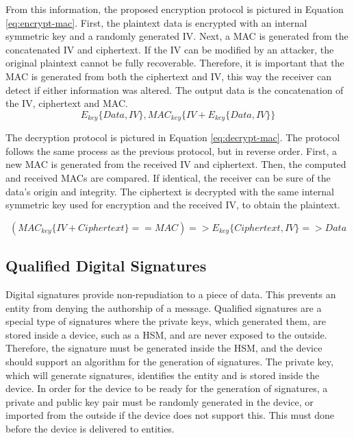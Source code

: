 From this information, the proposed encryption protocol is pictured in Equation \ref{eq:encrypt-mac}. First, the plaintext data is encrypted with an internal symmetric key and a randomly generated IV. Next, a MAC is generated from the concatenated IV and ciphertext.
If the IV can be modified by an attacker, the original plaintext cannot be fully recoverable. Therefore, it is important that the MAC is generated from both the ciphertext and IV, this way the receiver can detect if either information was altered.
The output data is the concatenation of the IV, ciphertext and MAC.
\begin{equation}
	\label{eq:encrypt-mac}
	E_{key}\{Data, IV\}, MAC_{key}\{IV+E_{key}\{Data, IV\}\}
\end{equation}

The decryption protocol is pictured in Equation \ref{eq:decrypt-mac}. The protocol follows the same process as the previous protocol, but in reverse order. First, a new MAC is generated from the received IV and ciphertext. Then, the computed and received MACs are compared. If identical, the receiver can be sure of the data's origin and integrity. The ciphertext is decrypted with the same internal symmetric key used for encryption and the received IV, to obtain the plaintext.

\begin{equation}
	\label{eq:decrypt-mac}
	(MAC_{key}\{IV+Ciphertext\} == MAC) => E_{key}\{Ciphertext, IV\} => Data
\end{equation}

\subsection{Qualified Digital Signatures}\label{chap:arch:services:signatures}

Digital signatures provide non-repudiation to a piece of data. This prevents an entity from denying the authorship of a message. Qualified signatures are a special type of signatures where the private keys, which generated them, are stored inside a device, such as a HSM, and are never exposed to the outside.
Therefore, the signature must be generated inside the HSM, and the device should support an algorithm for the generation of signatures.
The private key, which will generate signatures, identifies the entity and is stored inside the device. In order for the device to be ready for the generation of signatures, a private and public key pair must be randomly generated in the device, or imported from the outside if the device does not support this. This must done before the device is delivered to entities.

